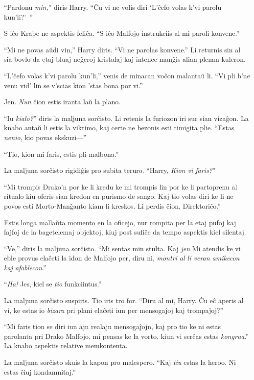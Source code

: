 ``Pardonu \emph{min,}'' diris Harry. ``Ĉu vi ne volis diri `L'ĉefo volas k'vi parolu kun'li?'\ ''

S-iĉo Krabe ne aspektis feliĉa. ``S-iĉo Malfojo instrukciis al mi paroli konvene.''

``Mi ne povas aŭdi vin,'' Harry diris. ``Vi ne parolas konvene.'' Li
returnis sin al sia bovlo da etaj bluaj neĝeroj kristalaj kaj intence
manĝis alian plenan kuleron.

``L'ĉefo volas k'vi parolu kun'li,'' venis de minacan voĉon malantaŭ
li. ``Vi pli b'ne venu vid' lin se v'scias kion 'stas bona por vi.''

Jen. \emph{Nun} ĉion estis iranta laŭ la plano.


``Iu \emph{kialo?}'' diris la maljuna sorĉisto. Li retenis la furiozon
iri sur sian vizaĝon. La knabo antaŭ li estis la viktimo, kaj certe ne
bezonis esti timigita plie. ``Estas \emph{nenio}, kio povas ekskuzi—''

``Tio, kion mi faris, estis pli malbona.''

La maljuna sorĉisto rigidiĝis pro subita teruro. ``Harry, \emph{Kion vi faris?}''

``Mi trompis Drako'n por ke li kredu ke mi trompis lin por ke li
partoprenu al ritualo kiu oferis sian kredon en purismo de sango. Kaj
tio volas diri ke li ne povos esti Morto-Manĝanto kiam li kreskos. Li
perdis ĉion, Direktoriĉo.''

Estis longa mallaŭta momento en la oficejo, nur rompita per la etaj
pufoj kaj fajfoj de la bagetelemaj objektoj, kiuj post sufiĉe da tempo
aspektis kiel silentaj.

``Ve,'' diris la maljuna sorĉisto. ``Mi sentas min stulta. Kaj
\emph{jen} Mi atendis ke vi eble provus elaĉeti la idon de Malfojo
per, diru ni, \emph{montri al li veran amikecon kaj afablecon}.''

``\emph{Ha!} Jes, kiel se \emph{tio} funkciintus.''

La maljuna sorĉisto suspiris. Tio iris tro for. ``Diru al mi,
Harry. Ĉu eĉ aperis al vi, ke estas io \emph{bizara} pri plani elaĉeti
iun per mensogaĵoj kaj trompaĵoj?''

``Mi faris tion se diri iun ajn realajn mensogaĵojn, kaj pro tio ke ni
estas parolanta pri Drako Malfojo, mi pensas ke la vorto, kiun vi
serĉas estas \emph{kongrua}.'' La knabo aspektis relative memkontenta.

La maljuna sorĉisto skuis la kapon pro malespero. ``Kaj \emph{tiu}
estas la heroo. Ni estas ĉiuj kondamnitaj.''


